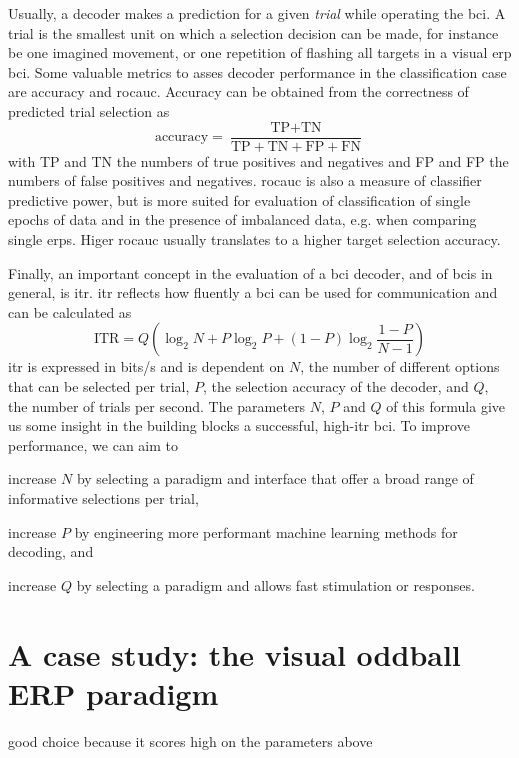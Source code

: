 Usually, a decoder makes a prediction for a given \emph{trial} while operating
the \ac{bci}.
A trial is the smallest unit on which a selection decision can be made, for
instance be one imagined movement, or one repetition of flashing all targets
in a visual \ac{erp} \ac{bci}.
Some valuable metrics to asses decoder performance in the classification case
are accuracy and \ac{rocauc}.
Accuracy can be obtained from the correctness of predicted trial selection as
\begin{equation}
  \text{accuracy} = \frac{\text{TP}+\text{TN}}{\text{TP}+\text{TN}+\text{FP}+\text{FN}}
\end{equation}
with TP and TN the numbers of true positives and negatives and FP and FP the
numbers of false positives and negatives.
\Ac{rocauc} is also a measure of classifier predictive power, but is more
suited for evaluation of classification of single epochs of data and in the
presence of imbalanced data, e.g. when
comparing single \ac{erps}.
Higer \ac{rocauc} usually translates to a higher target selection accuracy.

Finally, an important concept in the evaluation of a \ac{bci} decoder, and of \acp{bci}
in general, is \ac{itr}.
\Ac{itr} reflects how fluently a \ac{bci} can be used for communication and can
be calculated as
\begin{equation}
	\text{ITR} = Q\left(\log_2N+P\log_2P+(1-P)\log_2\frac{1-P}{N-1}\right)
\end{equation}
\Ac{itr} is expressed in bits/s and is dependent on $N$, the number of
different options that can be selected per trial, $P$, the selection accuracy
of the decoder, and $Q$, the number of trials per second.
The parameters $N$, $P$ and $Q$ of this formula give us some insight in the
building blocks a successful, high-\ac{itr} \ac{bci}.
To improve performance, we can aim to
\begin{enumerate*}[label={\arabic*})]
\item increase $N$ by selecting a paradigm and interface that offer a
broad range of informative selections per trial,
\item increase $P$ by engineering more performant machine learning methods for
decoding, and
\item increase $Q$ by selecting a paradigm and allows fast stimulation or
responses.
\end{enumerate*}


\section{A case study: the visual oddball ERP paradigm}
good choice because it scores high on the parameters above
